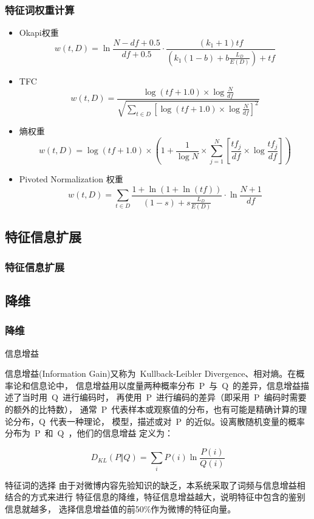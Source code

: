 \documentclass[CJKutf8, table, handout]{beamer}
\begin{document}
\begin{CJK}{UTF8}{gbsn}
\begin{frame}
  \frametitle{特征词权重计算}
  \begin{tiny}
    \begin{block}{}
      \begin{itemize}
        \item{Okapi权重\cite{Robertson}
          $$
          w(t, D) = \ln \frac{N-df+0.5}{df + 0.5}\cdot
          \frac{(k_1 + 1) tf}{(k_1(1-b)+b\frac{L_D}{E(D)})+tf}
          $$}
          \pause
        \item{TFC
          $$
          w(t, D) = \frac{\log (tf + 1.0) \times \log \frac{N}{df}}{\sqrt{\sum_{t \in
          D}\left[\log (tf + 1.0) \times \log \frac{N}{df}\right]^2}}
          $$}
          \pause
        \item{熵权重
          $$
          w(t, D) = \log (tf + 1.0) \times \left (1 + \frac{1}{\log N} \times
          \sum_{j = 1}^N\left [\frac{tf_j}{df} \times \log
          \frac{tf_j}{df}\right]\right)
          $$}
          \pause
        \item{Pivoted Normalization 权重\cite{Singhal}
          $$
          w(t, D) = \sum_{t\in D} \frac{1 + \ln (1+ \ln(tf))}{(1-s)+s
          \frac{L_D}{E(D)}}\cdot \ln \frac{N+1}{df}
          $$}
        \end{itemize}
    \end{block}
  \end{tiny}
\end{frame}

\subsection{特征信息扩展}
\begin{frame}
  \frametitle{特征信息扩展}
  
\end{frame}

\subsection{降维}
\begin{frame}
  \frametitle{降维}
  \begin{block}{信息增益}
    \begin{tiny}
    信息增益(Information Gain)又称为~Kullback-Leibler Divergence、相对熵。在概率论和信息论中，
    信息增益用以度量两种概率分布~P~与~Q~的差异，信息增益描述了当时用~Q~进行编码时，
    再使用~P~进行编码的差异（即采用~P~编码时需要的额外的比特数），
    通常~P~代表样本或观察值的分布，也有可能是精确计算的理论分布，Q~代表一种理论，
    模型，描述或对~P~的近似。设离散随机变量的概率分布为~P~和~Q~，他们的信息增益
    定义为：
    \end{tiny}
    \pause
    $$D_{KL}(P \Vert Q) = \sum_iP(i) \ln \frac{P(i)}{Q(i)}
    $$
  \end{block}
  \pause
  \begin{block}{特征词的选择}
    由于对微博内容先验知识的缺乏，本系统采取了词频与信息增益相结合的方式来进行
    特征信息的降维，特征信息增益越大，说明特征中包含的鉴别信息就越多，
    选择信息增益值的前50\%作为微博的特征向量。
  \end{block}
\end{frame}


\end{CJK}
\end{document}
